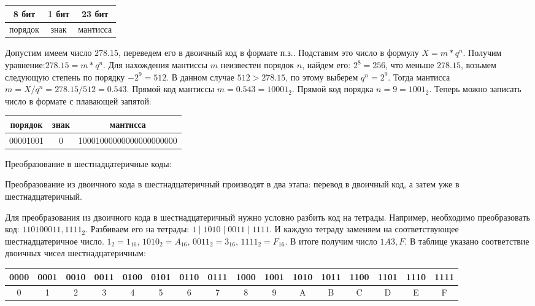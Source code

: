 \documentclass[unicode, 12pt, a4paper, oneside]{article}
\begin{document}
\begin{center}
\begin{tabular}{|c|c|c|}
\hline 8 бит   & 1 бит & 23 бит   \\ 
\hline порядок & знак  & мантисса \\ 
\hline 
\end{tabular}
\end{center}
 
Допустим имеем число $278.15$, переведем его в двоичный код в формате п.з.. Подставим это число в формулу $ X=m\ast q^{n} $. Получим уравнение:$278.15= m\ast q^{n}$. Для нахождения мантиссы $m$ неизвестен порядок $n $, найдем его: $2^{8}=256$, что меньше $278.15$, возьмем следующую степень по порядку $-2^{9}=512$. В данном случае $512>278.15$, по этому выберем $q^{n}=2^{9}$. Тогда мантисса $m=X/q^{n} =278.15/512=0.543$. Прямой код мантиссы $m=0.543=10001_{2}$. Прямой код порядка $n=9=1001_{2}$. Теперь можно записать число в формате с плавающей запятой:

\begin{center}
\begin{tabular}{|c|c|c|}
\hline порядок  & знак & мантисса                \\ 
\hline 00001001 & 0    & 10001000000000000000000 \\ 
\hline 
\end{tabular}
\end{center}

Преобразование в шестнадцатеричные коды:

Преобразование из двоичного кода в шестнадцатеричный производят в два этапа: перевод в двоичный код, а затем уже в шестнадцатеричный.

Для преобразования из двоичного кода в шестнадцатеричный нужно условно разбить код на тетрады. Например, необходимо преобразовать код: $ 110100011,1111_{2} $. Разбиваем его на тетрады: $ 1 \mid 1010 \mid 0011 \mid 1111 $. И каждую тетраду заменяем на соответствующее шестнадцатеричное число. $ 1_{2} = 1_{16} $, $ 1010_{2} = A_{16} $, $ 0011_{2} = 3_{16} $, $ 1111_{2} = F_{16} $. В итоге получим число $ 1A3,F $. В таблице указано соответствие двоичных чисел шестнадцатеричным:

\begin{center}
\small
\begin{tabular}{|c|c|c|c|c|c|c|c|c|c|c|c|c|c|c|c|}
\hline 0000 & 0001 & 0010 & 0011 & 0100 & 0101 & 0110 & 0111 & 1000 & 1001 & 1010 & 1011 & 1100 & 1101 & 1110 & 1111 \\ 
\hline 0 & 1 & 2 & 3 & 4 & 5 & 6 & 7 & 8 & 9 & A & B & C & D & E & F \\ 
\hline 
\end{tabular}
\end{center}
\end{document}

